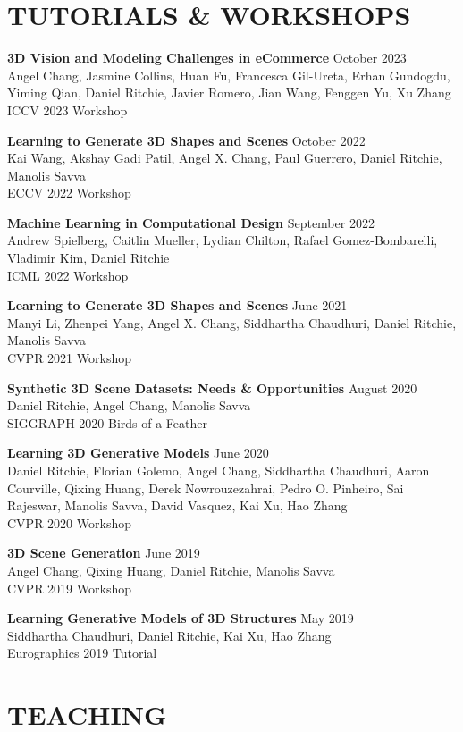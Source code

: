 \documentclass[line,margin]{res}
\begin{document}
\begin{resume}
\section{TUTORIALS \& WORKSHOPS}

\newcommand{\tutorial}[4] {
	\textbf{#1} \hfill #4\\
	#2\\
	#3
}
\newcommand{\workshop}[4] {
	\textbf{#1} \hfill #4\\
	#2\\
	#3
}

\workshop
{3D Vision and Modeling Challenges in eCommerce}
{Angel Chang, Jasmine Collins, Huan Fu, Francesca Gil-Ureta, Erhan Gundogdu, Yiming Qian, Daniel Ritchie, Javier Romero, Jian Wang, Fenggen Yu, Xu Zhang}
{ICCV 2023 Workshop}
{October 2023}

\workshop
{Learning to Generate 3D Shapes and Scenes}
{Kai Wang, Akshay Gadi Patil, Angel X. Chang, Paul Guerrero, Daniel Ritchie, Manolis Savva}
{ECCV 2022 Workshop}
{October 2022}

\workshop
{Machine Learning in Computational Design}
{Andrew Spielberg, Caitlin Mueller, Lydian Chilton, Rafael Gomez-Bombarelli, Vladimir Kim, Daniel Ritchie}
{ICML 2022 Workshop}
{September 2022}

\workshop
{Learning to Generate 3D Shapes and Scenes}
{Manyi Li, Zhenpei Yang, Angel X. Chang, Siddhartha Chaudhuri, Daniel Ritchie, Manolis Savva}
{CVPR 2021 Workshop}
{June 2021}

\workshop
{Synthetic 3D Scene Datasets: Needs \& Opportunities}
{Daniel Ritchie, Angel Chang, Manolis Savva}
{SIGGRAPH 2020 Birds of a Feather}
{August 2020}

\workshop
{Learning 3D Generative Models}
{Daniel Ritchie, Florian Golemo, Angel Chang, Siddhartha Chaudhuri, Aaron Courville, Qixing Huang, Derek Nowrouzezahrai, Pedro O. Pinheiro, Sai Rajeswar, Manolis Savva, David Vasquez, Kai Xu, Hao Zhang}
{CVPR 2020 Workshop}
{June 2020}

\workshop
{3D Scene Generation}
{Angel Chang, Qixing Huang, Daniel Ritchie, Manolis Savva}
{CVPR 2019 Workshop}
{June 2019}

\tutorial
{Learning Generative Models of 3D Structures}
{Siddhartha Chaudhuri, Daniel Ritchie, Kai Xu, Hao Zhang}
{Eurographics 2019 Tutorial}
{May 2019}


\section{TEACHING}


\end{resume}
\end{document}
